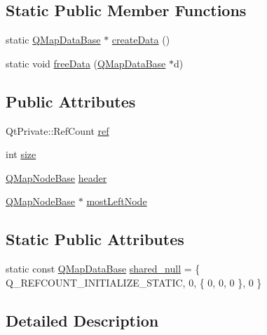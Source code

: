 \subsection*{Static Public Member Functions}
\begin{DoxyCompactItemize}
\item 
static \hyperlink{struct_q_map_data_base}{Q\+Map\+Data\+Base} $\ast$ \hyperlink{struct_q_map_data_base_ab73fd1ef8a7fc94981f175cc8c961498}{create\+Data} ()
\item 
static void \hyperlink{struct_q_map_data_base_a0d6f53d631ecc76af76e79ceb9557e4a}{free\+Data} (\hyperlink{struct_q_map_data_base}{Q\+Map\+Data\+Base} $\ast$d)
\end{DoxyCompactItemize}
\subsection*{Public Attributes}
\begin{DoxyCompactItemize}
\item 
Qt\+Private\+::\+Ref\+Count \hyperlink{struct_q_map_data_base_ab3039892c5c68597eeb0746c26459d42}{ref}
\item 
int \hyperlink{struct_q_map_data_base_a61b8b87aa9f55d8380f67b5b9f4bc786}{size}
\item 
\hyperlink{struct_q_map_node_base}{Q\+Map\+Node\+Base} \hyperlink{struct_q_map_data_base_a11102879d6fba5de5d44220294c4ac03}{header}
\item 
\hyperlink{struct_q_map_node_base}{Q\+Map\+Node\+Base} $\ast$ \hyperlink{struct_q_map_data_base_a836e3d0106d5ae7a9bb5f61ab06ee7ef}{most\+Left\+Node}
\end{DoxyCompactItemize}
\subsection*{Static Public Attributes}
\begin{DoxyCompactItemize}
\item 
static const \hyperlink{struct_q_map_data_base}{Q\+Map\+Data\+Base} \hyperlink{struct_q_map_data_base_ac279e752e04494bb619c9d26763d2eb7}{shared\+\_\+null} = \{ Q\+\_\+\+R\+E\+F\+C\+O\+U\+N\+T\+\_\+\+I\+N\+I\+T\+I\+A\+L\+I\+Z\+E\+\_\+\+S\+T\+A\+T\+IC, 0, \{ 0, 0, 0 \}, 0 \}
\end{DoxyCompactItemize}


\subsection{Detailed Description}


